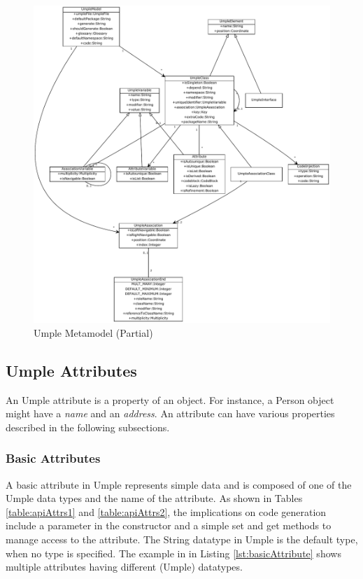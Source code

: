 \begin{figure}[h]
\includegraphics[width=1\textwidth]{Figures/metamodelUmple.pdf} 
\caption{Umple Metamodel (Partial)}
\label{fig:umpleMetamodel}
\end{figure}

\subsection{Umple Attributes}

An Umple attribute is a property of an object. For instance, 
a Person object might have a \textit{name} and an \textit{address}. 
An attribute can have various properties described in the following subsections.

\subsubsection{Basic Attributes}
A basic attribute in Umple represents simple data and is composed of one of the Umple data types and the name of the attribute. As shown in Tables \ref{table:apiAttrs1} and \ref{table:apiAttrs2}, the implications on code generation include a parameter in the constructor and a simple set and get methods to manage access to the attribute. The String datatype in Umple is the default type, when no type is specified. The example in in Listing \ref{lst:basicAttribute} shows multiple attributes having different (Umple) datatypes.

